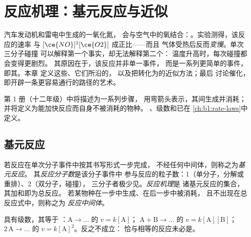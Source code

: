 \chapter{反应机理：基元反应与近似}\label{ch:b1:elementary-steps}

汽车发动机和雷电中生成的一氧化氮，
会与空气中的氧结合：。实验测得，该反应的速率
与 $[\ce{NO}]^2[\ce{O2}]$ 成正比——而且
气体受热后反而\emph{变慢}。单次三分子碰撞
可以解释第一个事实，却无法解释第二个：
温度升高时，每次碰撞都会变得更剧烈。
其原因在于，该反应并非单一事件，
而是一系列更简单的事件，即其。本章
定义这些、它们所沿的，
以及把转化为的近似方法；最后
讨论催化，即开辟一条更容易通行的路径的艺术。

\begin{recall}
第 1 册（十二年级）中将描述为一系列步骤，
用弯箭头表示，其间生成并消耗；
并将定义为能加快反应而自身不被消耗的物种。
、级数和已在
\cref{ch:b1:rate-laws}中定义。
\end{recall}

\section{基元反应}

\begin{definition}\label{def:b1:elementary-steps:elementary-step}
若反应在单次分子事件中按其书写形式一步完成，
不经任何中间体，则称之为\emph{基元反应}。
其\emph{反应分子数}是该分子事件中
参与反应的粒子数：1（单分子，分解或重排）、2（双分子，碰撞），
三分子者极少见。\emph{反应机理}是
诸基元反应的集合，其加和即为总反应。
若某物种在一步中生成、在后一步中被消耗，
且不出现在总反应式中，则称之为
\emph{反应中间体}。
\end{definition}

\begin{proposition}[基元反应的速率方程]\label{prop:b1:elementary-steps:elementary-law}
具有级数，其等于
：$\mathrm{A} \to \dots$ 的 $v = k[\mathrm{A}]$；
$\mathrm{A} + \mathrm{B} \to \dots$ 的 $v = k[\mathrm{A}][\mathrm{B}]$；
$2\,\mathrm{A} \to \dots$ 的 $v = k[\mathrm{A}]^2$。反之不成立：
恰与相等的反应未必是。
\end{proposition}

